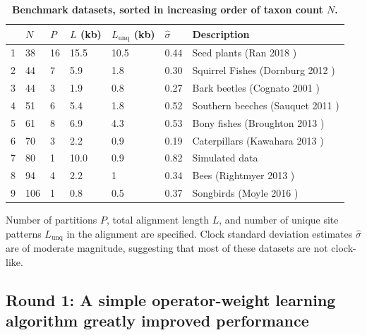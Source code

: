 \documentclass[10pt,letterpaper]{article}
\begin{document}
\begin{table}[h!]
\centering
\caption{\bf{Benchmark datasets, sorted in increasing order of taxon count $N$.}}
\begin{tabular}{l l l l l l l} 
  & $N$ & $P$ & $L$ (kb) & $L_\text{unq}$ (kb) & $\hat{\sigma}$ & \textbf{Description} \\
  \hline
 
 
 1  &  38  &  16  &  15.5  &  10.5 &  0.44 &  Seed plants (Ran 2018 \cite{Ran_2018}) \\ 

2  &  44  &  7  &  5.9  &  1.8& 0.30 &  Squirrel Fishes (Dornburg 2012 \cite{Dornburg_2012}) \\ 

3  &  44  &  3  &  1.9  &  0.8& 0.27  &  Bark beetles (Cognato 2001 \cite{Cognato_2001}) \\ 

4  &  51  &  6  &  5.4  &  1.8 & 0.52 &  Southern beeches (Sauquet 2011 \cite{Sauquet_2011}) \\ 

5  &  61  &  8  &  6.9  &  4.3 & 0.53 &  Bony fishes (Broughton 2013 \cite{Broughton_2013}) \\ 

6  &  70  &  3  &  2.2  &  0.9  & 0.19 &  Caterpillars (Kawahara 2013 \cite{Kawahara_2013}) \\ 

7  &  80  &  1 &  10.0  &  0.9 & 0.82 &  Simulated data  \\ 

8  &  94  &  4  &  2.2  &  1 & 0.34 &  Bees (Rightmyer 2013 \cite{Rightmyer_2013}) \\ 

9  &  106  &  1  &  0.8  &  0.5 & 0.37 &  Songbirds (Moyle 2016 \cite{Moyle_2016}) \\ 



\end{tabular}
\begin{flushleft}
Number of partitions $P$, total alignment length $L$, and number of unique site patterns $L_\text{unq}$ in the alignment are specified.
Clock standard deviation estimates $\hat\sigma$ are of moderate magnitude, suggesting that most of these datasets are not clock-like.
\end{flushleft}
\label{table:datasets}
\end{table}


\clearpage
\subsection*{Round 1: A simple operator-weight learning algorithm greatly improved performance}
\end{document}
